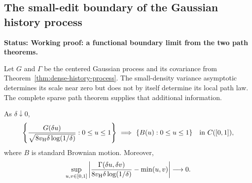 \documentclass[11pt,letterpaper]{article}
\newcommand{\status}[1]{\textbf{Status: #1.}}
\begin{document}
\subsection{The small-edit boundary of the Gaussian history process}
\label{sec:small-edit-Gaussian-tangent}

\status{Working proof: a functional boundary limit from the two path theorems}

Let $G$ and $\Gamma$ be the centered Gaussian process and its
covariance from Theorem~\ref{thm:dense-history-process}.
The small-density variance asymptotic determines its scale
near zero but does not by itself determine its local path law.
The complete sparse path theorem supplies that additional information.

\begin{theorem}
\label{thm:small-edit-Gaussian-tangent}
As $\delta\downarrow0$,
\begin{equation}\label{eq:small-edit-Gaussian-tangent}
 \left\{\frac{G(\delta u)}
                {\sqrt{8v_{\rm H}\delta\log(1/\delta)}}:
                   0\le u\le1\right\}
       \ \Longrightarrow\ \{B(u):0\le u\le1\}
                  \quad\hbox{in }C([0,1]),
\end{equation}
where $B$ is standard Brownian motion. Moreover,
\begin{equation}\label{eq:small-edit-kernel-tangent}
 \sup_{u,v\in[0,1]}
 \left|
 \frac{\Gamma(\delta u,\delta v)}
                   {8v_{\rm H}\delta\log(1/\delta)}
                  -\min(u,v)\right|\longrightarrow0.
\end{equation}
\end{theorem}
\end{document}
